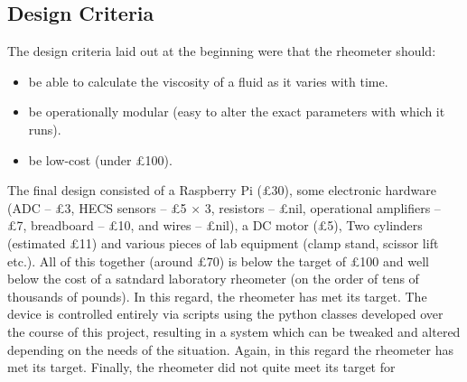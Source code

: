 \documentclass[twoside,a4]{report}
\begin{document}
	\subsection*{Design Criteria}
	The design criteria laid out at the beginning were that the rheometer should:
	\begin{itemize}
		\item be able to calculate the viscosity of a fluid as it varies with time.
		\item be operationally modular (easy to alter the exact parameters with which it runs).
		\item be low-cost (under \pounds 100).
	\end{itemize}
	The final design consisted of a Raspberry Pi (\pounds 30), some electronic hardware (ADC -- \pounds 3, HECS sensors -- \pounds 5 $\times$ 3, resistors -- \pounds nil, operational amplifiers -- \pounds 7, breadboard -- \pounds 10, and wires -- \pounds nil), a DC motor (\pounds 5), Two cylinders (estimated \pounds 11) and various pieces of lab equipment (clamp stand, scissor lift etc.). All of this together (around \pounds 70) is below the target of \pounds 100 and well below the cost of a satndard laboratory rheometer (on the order of tens of thousands of pounds). In this regard, the rheometer has met its target.
	The device is controlled entirely via scripts using the python classes developed over the course of this project, resulting in a system which can be tweaked and altered depending on the needs of the situation. Again, in this regard the rheometer has met its target.
	Finally, the rheometer did not quite meet its target for 
	
\end{document}
